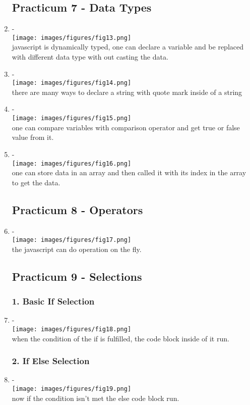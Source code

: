 \documentclass[12pt,titlepage]{article}
\begin{document}
\begin{enumerate}
    \subsection*{Practicum 7 - Data Types}
    \item - \\ \texttt{[image: images/figures/fig13.png]} \\ javascript is dynamically typed, one can declare a variable and be replaced with different data type with out casting the data.
    \newpage
    \item - \\ \texttt{[image: images/figures/fig14.png]} \\ there are many ways to declare a string with quote mark inside of a string
    \item - \\ \texttt{[image: images/figures/fig15.png]} \\ one can compare variables with comparison operator and get true or false value from it.
    \newpage
    \item - \\ \texttt{[image: images/figures/fig16.png]} \\ one can store data in an array and then called it with its index in the array to get the data.
    \subsection*{Practicum 8 - Operators}
    \item - \\ \texttt{[image: images/figures/fig17.png]} \\ the javascript can do operation on the fly.
    \subsection*{Practicum 9 - Selections}
    \subsubsection*{1. Basic If Selection}
    \item - \\ \texttt{[image: images/figures/fig18.png]} \\ when the condition of the if is fulfilled, the code block inside of it run.
    \subsubsection*{2. If Else Selection}
    \item - \\ \texttt{[image: images/figures/fig19.png]} \\ now if the condition isn't met the else code block run.

\end{enumerate}
\end{document}

